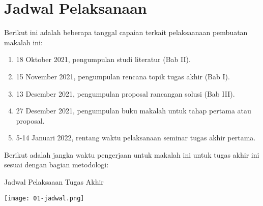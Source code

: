 \section{Jadwal Pelaksanaan}

Berikut ini adalah beberapa tanggal capaian terkait pelaksaanaan pembuatan makalah ini:

\begin{enumerate}
  \item 18 Oktober 2021, pengumpulan studi literatur (Bab II).
  \item 15 November 2021, pengumpulan rencana topik tugas akhir (Bab I).
  \item 13 Desember 2021, pengumpulan proposal rancangan solusi (Bab III).
  \item 27 Desember 2021, pengumpulan buku makalah untuk tahap pertama atau proposal.
  \item 5-14 Januari 2022, rentang waktu pelaksanaan seminar tugas akhir pertama.
\end{enumerate}

Berikut adalah jangka waktu pengerjaan untuk makalah ini untuk tugas akhir ini sesuai dengan bagian metodologi:

\begin{table}[ht]
  \centering
  \caption{Jadwal Pelaksaaan Tugas Akhir}
  \texttt{[image: 01-jadwal.png]}
\end{table}


    

